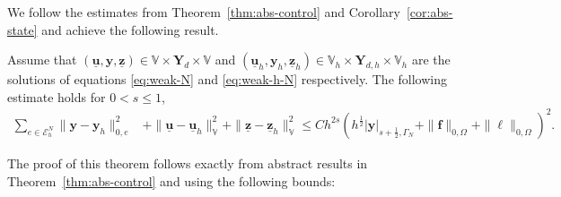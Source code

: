 \documentclass[smallextended]{svjour3}
\numberwithin{equation}{section}
\numberwithin{figure}{section}
\numberwithin{table}{section}
\newcommand\bPi{\boldsymbol{\Pi}}
\newcommand\ff{\boldsymbol{f}}
\newcommand{\tP}{\tilde{P}}
\newcommand\buu{\underline{\boldsymbol{u}}}
\newcommand\buz{\underline{\boldsymbol{z}}}
\newcommand\bx{\boldsymbol{x}}
\newcommand\by{\boldsymbol{y}}
\newcommand\bu{\boldsymbol{u}}
\newcommand\bz{\boldsymbol{z}}
\newcommand{\bYd}{\boldsymbol{Y}_d}
\newcommand{\bY}{\boldsymbol{Y}}
\newcommand{\bbV}{\mathbb{V}}
\begin{document}

\noindent We follow the estimates from Theorem~\ref{thm:abs-control} and Corollary~\ref{cor:abs-state} and achieve the following result.
\begin{theorem} \label{thm:abs-control-N}
	Assume that $(\buu,\by,\buz) \in \bbV \times \bYd \times \bbV$ and $(\buu_h, \by_h, \buz_h) \in \bbV_h \times \bY_{d,h} \times \bbV_h$ are the solutions of equations \eqref{eq:weak-N} and \eqref{eq:weak-h-N} respectively. The following estimate holds for $0 < s \le 1$,
	\begin{align*}
		\sum_{e \in \mathcal{E}_h^N} \| \by - \by_h \|_{0,e}^2 & 
        + \| \buu - \buu_h \|_{\bbV}^2 
        + \| \buz - \buz_h \|_{\bbV}^2 \le C h^{2s} (h^{\frac{1}{2}} |\by|_{s+\frac{1}{2}, \Gamma_N} 
        + \|\ff \|_{0, \Omega} + \|\ell\|_{0, \Omega})^2. 
	\end{align*}
\end{theorem}
The proof of this theorem follows exactly from abstract results in Theorem~\ref{thm:abs-control} and using the following bounds:
\end{document}
